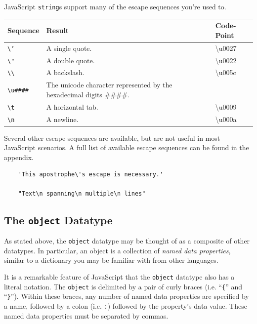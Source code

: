 \documentclass[11pt,letter]{book}
\begin{document}
    JavaScript \texttt{string}s support many of the escape sequences you're used to.
    
    \vspace{10pt}
    \begin{tabular}{l|l|l}
        Sequence & Result & Code-Point \\
        \hline
        \texttt{\textbackslash{'}}  & A single quote. & \textbackslash{u0027} \\
        \texttt{\textbackslash{"}}  & A double quote. & \textbackslash{u0022} \\
        \texttt{\textbackslash\textbackslash} 
                                    & A backslash. & \textbackslash{u005c} \\
        \texttt{\textbackslash{u\#\#\#\#}}
                                    & The unicode character represented by the hexadecimal
                                        digits \#\#\#\#. & \\
        \texttt{\textbackslash{t}}  & A horizontal tab. & \textbackslash{u0009} \\
        \texttt{\textbackslash{n}}  & A newline. & \textbackslash{u000a} \\
    \end{tabular}
    \vspace{10pt}
    
    Several other escape sequences are available, but are not useful in most JavaScript scenarios. 
    A full list of available escape sequences can be found in the appendix.
    
    \begin{verbatim}
    'This apostrophe\'s escape is necessary.'
    
    "Text\n spanning\n multiple\n lines"
    \end{verbatim}
    
    \subsection{The \texttt{object} Datatype}
    
    As stated above, the \texttt{object} datatype may be thought of as a composite of other 
    datatypes. In particular, an object is a collection of \emph{named data properties}, similar
    to a dictionary you may be familiar with from other languages.
    
    It is a remarkable feature of JavaScript that the \texttt{object} datatype also has a literal
    notation. The \texttt{object} is delimited by a pair of curly braces (i.e. ``\texttt{\{}'' and 
    ``\texttt{\}}''). Within these braces, any number of named data properties are specified by a 
    name, followed by a colon (i.e. \texttt{:}) followed by the property's data value. These named 
    data properties must be separated by commas.
    
\end{document}
